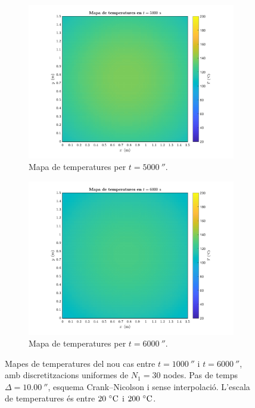 \begin{figure}[ht]
\begin{subfigure}{.5\textwidth}
		\includegraphics[width=.95\linewidth]{imagenes/06_canvi_condicions_contorn/t_5000.pdf}
		\vspace{-10pt}
		\caption{Mapa de temperatures per $t = 5000 \ \second$.}
		\label{fig:nou_t_5000}
	\end{subfigure}%
	\begin{subfigure}{.5\textwidth}
		\centering
		\includegraphics[width=.95\linewidth]{imagenes/06_canvi_condicions_contorn/t_6000.pdf}
		\vspace{-10pt}
		\caption{Mapa de temperatures per $t = 6000 \ \second$.}
		\label{fig:nou_t_6000}
	\end{subfigure}
	\caption{Mapes de temperatures del nou cas entre $t = 1000 \ \second$ i $t = 6000 \ \second$, amb discretitzacions uniformes de $N_1 = 30$ nodes. Pas de temps $\Delta = 10.00 \ \second$, esquema Crank--Nicolson i sense interpolació. L'escala de temperatures és entre $20 \ \celsius$ i $200 \ \celsius$.}
	\label{fig:nous_1}
\end{figure} 

